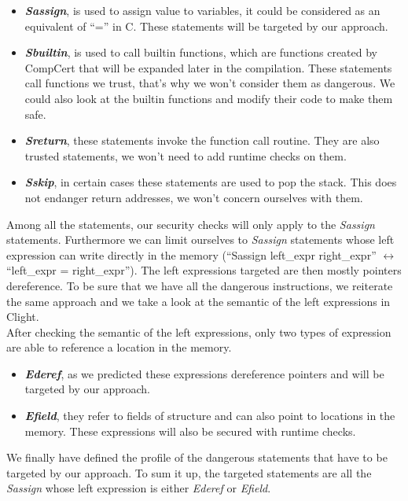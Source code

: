 \documentclass[11pt]{sdm}
\begin{document}
\begin{itemize}
	\item \textbf{\textit{Sassign}}, is used to assign value to variables, it could be considered as an equivalent of ``='' in C. These statements will be targeted by our approach.
	\item \textbf{\textit{Sbuiltin}}, is used to call builtin functions, which are functions created by CompCert that will be expanded later in the compilation. These statements call functions we trust, that's why we won't consider them as dangerous. We could also look at the builtin functions and modify their code to make them safe.
	\item \textbf{\textit{Sreturn}}, these statements invoke the function call routine. They are also trusted statements, we won't need to add runtime checks on them.
	\item \textbf{\textit{Sskip}}, in certain cases these statements are used to pop the stack. This does not endanger return addresses, we won't concern ourselves with them.
\end{itemize}
Among all the statements, our security checks will only apply to the \textit{Sassign} statements.
Furthermore we can limit ourselves to \textit{Sassign} statements whose left expression can write directly in the memory (``Sassign left\_expr right\_expr'' $\leftrightarrow$ ``left\_expr = right\_expr''). The left expressions targeted are then mostly pointers dereference. To be sure that we have all the dangerous instructions, we reiterate the same approach and we take a look at the semantic of the left expressions in Clight.\\
After checking the semantic of the left expressions, only two types of expression are able to reference a location in the memory.

\begin{itemize}
	\item \textbf{\textit{Ederef}}, as we predicted these expressions dereference pointers and will be targeted by our approach.
	\item \textbf{\textit{Efield}}, they refer to fields of structure and can also point to locations in the memory. These expressions will also be secured with runtime checks.
\end{itemize}

We finally have defined the profile of the dangerous statements that have to be targeted by our approach. To sum it up, the targeted statements are all the \textit{Sassign} whose left expression is either \textit{Ederef} or \textit{Efield}.
\end{document}
